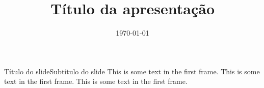 \documentclass[xcolor=dvipsnames, aspectratio=169]{beamer}
\title{Título da apresentação}
\date{\today}
\begin{document}
\titlepage

\begin{frame}{Título do slide}{Subtítulo do slide}
This is some text in the first frame. This is some text in the first frame. This is some text in the first frame.
\end{frame}
\end{document}
